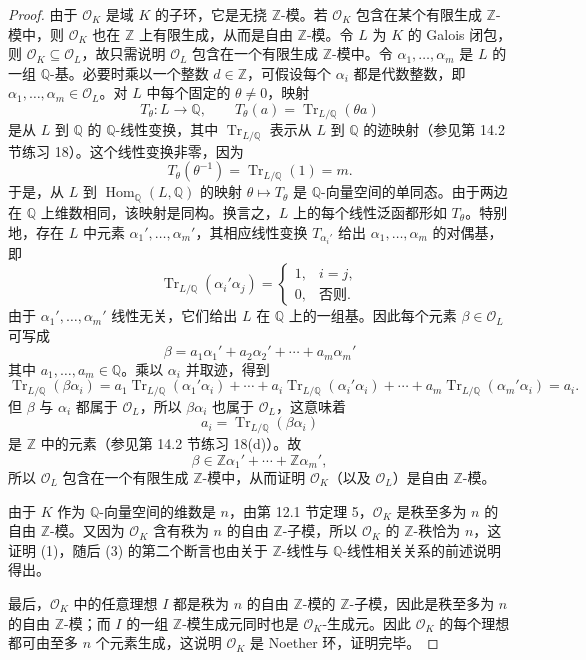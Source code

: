 \begin{proof}
	由于 $\mathcal O_K$ 是域 $K$ 的子环，它是无挠 $\mathbb Z$-模。若 $\mathcal O_K$ 包含在某个有限生成 $\mathbb Z$-模中，则 $\mathcal O_K$ 也在 $\mathbb Z$ 上有限生成，从而是自由 $\mathbb Z$-模。令 $L$ 为 $K$ 的 Galois 闭包，则 $\mathcal O_K\subseteq\mathcal O_L$，故只需说明 $\mathcal O_L$ 包含在一个有限生成 $\mathbb Z$-模中。令 $\alpha_1,
	\ldots,
	\alpha_m$ 是 $L$ 的一组 $\mathbb Q$-基。必要时乘以一个整数 $d\in\mathbb Z$，可假设每个 $\alpha_i$ 都是代数整数，即 $\alpha_1,
	\ldots,
	\alpha_m\in\mathcal O_L$。对 $L$ 中每个固定的 $\theta\ne0$，映射
	\[
	T_\theta:L\longrightarrow\mathbb Q,
	\qquad
	T_\theta(a)=\operatorname{Tr}_{L/\mathbb Q}(\theta a)
	\]
	是从 $L$ 到 $\mathbb Q$ 的 $\mathbb Q$-线性变换，其中 $\operatorname{Tr}_{L/\mathbb Q}$ 表示从 $L$ 到 $\mathbb Q$ 的迹映射（参见第 14.2 节练习 18）。这个线性变换非零，因为
	\[
	T_\theta(\theta^{-1})=\operatorname{Tr}_{L/\mathbb Q}(1)=m.
	\]
	于是，从 $L$ 到 $\operatorname{Hom}_{\mathbb Q}(L,\mathbb Q)$ 的映射 $\theta\mapsto T_\theta$ 是 $\mathbb Q$-向量空间的单同态。由于两边在 $\mathbb Q$ 上维数相同，该映射是同构。换言之，$L$ 上的每个线性泛函都形如 $T_\theta$。特别地，存在 $L$ 中元素 $\alpha_1',
	\ldots,
	\alpha_m'$，其相应线性变换 $T_{\alpha_i'}$ 给出 $\alpha_1,
	\ldots,
	\alpha_m$ 的对偶基，即
	\[
	\operatorname{Tr}_{L/\mathbb Q}(\alpha_i'\alpha_j)=
	\begin{cases}
		1,& i=j,\\
		0,& \text{否则}.
	\end{cases}
	\]
	由于 $\alpha_1',
	\ldots,
	\alpha_m'$ 线性无关，它们给出 $L$ 在 $\mathbb Q$ 上的一组基。因此每个元素 $\beta\in\mathcal O_L$ 可写成
	\[
	\beta=a_1\alpha_1'+a_2\alpha_2'+\cdots+a_m\alpha_m'
	\]
	其中 $a_1,
	\ldots,
	a_m\in\mathbb Q$。乘以 $\alpha_i$ 并取迹，得到
	\[
	\operatorname{Tr}_{L/\mathbb Q}(\beta\alpha_i)
	=a_1\operatorname{Tr}_{L/\mathbb Q}(\alpha_1'\alpha_i)+\cdots+a_i\operatorname{Tr}_{L/\mathbb Q}(\alpha_i'\alpha_i)+\cdots+a_m\operatorname{Tr}_{L/\mathbb Q}(\alpha_m'\alpha_i)=a_i.
	\]
	但 $\beta$ 与 $\alpha_i$ 都属于 $\mathcal O_L$，所以 $\beta\alpha_i$ 也属于 $\mathcal O_L$，这意味着
	\[
	a_i=\operatorname{Tr}_{L/\mathbb Q}(\beta\alpha_i)
	\]
	是 $\mathbb Z$ 中的元素（参见第 14.2 节练习 18(d)）。故
	\[
	\beta\in\mathbb Z\alpha_1'+\cdots+\mathbb Z\alpha_m',
	\]
	所以 $\mathcal O_L$ 包含在一个有限生成 $\mathbb Z$-模中，从而证明 $\mathcal O_K$（以及 $\mathcal O_L$）是自由 $\mathbb Z$-模。
	
	由于 $K$ 作为 $\mathbb Q$-向量空间的维数是 $n$，由第 12.1 节定理 5，$\mathcal O_K$ 是秩至多为 $n$ 的自由 $\mathbb Z$-模。又因为 $\mathcal O_K$ 含有秩为 $n$ 的自由 $\mathbb Z$-子模，所以 $\mathcal O_K$ 的 $\mathbb Z$-秩恰为 $n$，这证明 (1)，随后 (3) 的第二个断言也由关于 $\mathbb Z$-线性与 $\mathbb Q$-线性相关关系的前述说明得出。
	
	最后，$\mathcal O_K$ 中的任意理想 $I$ 都是秩为 $n$ 的自由 $\mathbb Z$-模的 $\mathbb Z$-子模，因此是秩至多为 $n$ 的自由 $\mathbb Z$-模；而 $I$ 的一组 $\mathbb Z$-模生成元同时也是 $\mathcal O_K$-生成元。因此 $\mathcal O_K$ 的每个理想都可由至多 $n$ 个元素生成，这说明 $\mathcal O_K$ 是 Noether 环，证明完毕。
\end{proof}

